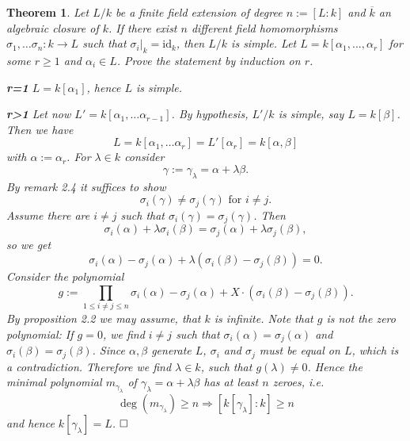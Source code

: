 \documentclass[11pt]{book}
\newtheorem{theorem}{Theorem}[section]
\theoremstyle{nonumberbreak}
\newenvironment{pr}[1][]{\ifthenelse{\equal{#1}{}}{\proof}{\proof[#1]}\rm}{\endproof}
\begin{document}
\begin{spacing}{1.3}
\begin{theorem} %
Let $L/k$ be a finite field extension of degree $n:=[L:k]$ and $\overline{k}$ an algebraic closure of $k$.
If there exist $n$ different field homomorphisms $\sigma_1, \dots \sigma_n: k \longrightarrow L$ such that $\sigma_i |_{k}=\textrm{id}_{k}$, then $L/k$ is simple.
\begin{pr}
Let $L=k[\alpha_1,...,\alpha_r]$ for some $r\geqslant 1 $ and $\alpha_i \in L$. Prove the statement by induction on $r$.
\begin{compactitem}
\item[\textbf{r=1}] $L=k[\alpha_1]$, hence $L$ is simple.
\item[\textbf{r>1}] Let now $L'=k[\alpha_1, \dots \alpha_{r-1}]$. By hypothesis, $L'/k$ is simple, say $L=k[\beta]$. Then we have $$L=k[\alpha_1, \dots \alpha_r]=L'[\alpha_r]=k[\alpha, \beta]$$ with $\alpha:=\alpha_r$.
For $\lambda \in k$ consider $$\gamma:=\gamma_{\lambda}=\alpha + \lambda \beta.$$By remark 2.4 it suffices to show $$\sigma_i(\gamma) \neq \sigma_j(\gamma) \textrm{ for }i\neq j.$$Assume there are $i\neq j$ such that $\sigma_i(\gamma)=\sigma_j(\gamma)$.
Then $$\sigma_i(\alpha)+ \lambda \sigma_i(\beta)=\sigma_j(\alpha)+\lambda \sigma_j(\beta),$$so we get $$\sigma_i(\alpha)-\sigma_j(\alpha)+\lambda\left(\sigma_i(\beta)-\sigma_j(\beta)\right)=0.$$Consider the polynomial $$g:=\prod_{1\leqslant i \neq j \leqslant n}\sigma_i(\alpha)-\sigma_j(\alpha)+X\cdot\left(\sigma_i(\beta)-\sigma_j(\beta)\right).$$
By proposition 2.2 we may assume, that $k$ is infinite. Note that $g$ is not the zero polynomial: If $g=0$, we find $i\neq j$ such that $\sigma_i(\alpha)=\sigma_j(\alpha)$ and $\sigma_i(\beta)=\sigma_j(\beta)$. Since $\alpha, \beta$ generate $L$, $\sigma_i$ and $\sigma_j$ must be equal on $L$, which is a contradiction.
Therefore we find $\lambda \in k$, such that $g(\lambda)\neq 0$. Hence the minimal polynomial $m_{\gamma_{\lambda}}$ of $\gamma_{\lambda}=\alpha + \lambda \beta$ has at least $n$ zeroes, i.e. $$\deg(m_{\gamma_{\lambda}}) \geqslant n \Rightarrow [k[\gamma_{\lambda}]:k]\geqslant n$$ and hence $k[\gamma_{\lambda}]=L$. $\hfill \Box$
\end{compactitem}
\end{pr}
\end{theorem}



\end{spacing}
\end{document}
